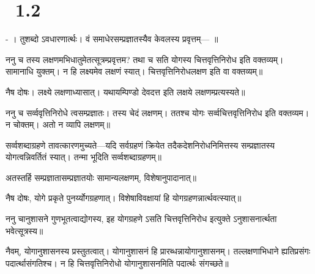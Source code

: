 \section{\pysv\ 1.2}
\setlength{\footmarkwidth}{1.8em}
\pagewiselinenumbers
\newlength{\dawidth}
\settowidth{\dawidth}{ड}
\addtolength{\dawidth}{0.08em}
 \kern -\dawidth {} । तुशब्दो ऽवधारणार्त्थः। वं समाधेरसम्प्रज्ञातस्यैव केवलस्य  प्रवृत्तम्---
\newfontfamily
{} \mds {}॥

ननु च त\mte स्य लक्षणमभिधातुमेतत्सूत्रम्प्रवृत्तम? तथा च सति योगस्य चित्तवृत्तिनिरोध इति वक्तव्यम्। 
सामानाधि युक्तम्। न हि लक्ष्यमेव लक्षणं स्यात्। चित्तवृत्तिनिरोधलक्षण इति वा वक्तव्यम्॥

नैष दोषः। लक्ष्ये ल\mms क्षण\mds ाध्यासात्। यथा\mte यम्पिण्डो देवदत्त इति लक्षये लक्षणम्प्रत्यस्यते॥

ननु \mms च स\mme र्व्ववृत्तिनिरोधे त्वसम्प्रज्ञातः। तस्य चे\mms दं लक्षणम्। ततश्च योगः सर्व्वचि\mme त्तवृत्तिनिरोध इति वक्तव्यम। न चोक्तम्। अतो न व्या\mds पि \mms लक्षणम्॥

सर्व्वशब्दाग्रहणे तावत्कारणमुच्यते---यदि सर्व\mte ग्रहणं क्रियेत तदैकदेशनिरोधनिमित्तस्य सम्प्रज्ञातस्य योगत्वन्निवर्तितं स्यात्। तन्मा भूदिति सर्व्वशब्दाग्रहणम्॥

अतस्तर्हि सम्प्रज्ञातासम्प्रज्ञातयोः सामान्यलक्षणम्, विशेषानुपादानात्॥

नैष दोषः, योगे प्रकृते पुनर्य्योगग्रहणात्। वि\mts शेषाविवक्षायां हि यो\mde ग\mme ग्रहणन्नार्त्थवत्स्यात्॥

ननु चानुशासने गुणभूतत्वाद्योगस्य, इह योगग्रहणे ऽसति चित्तवृत्तिनिरोध इत्युक्ते ऽनुशासनार्त्थता भवेत्सूत्रस्य॥

नैवम्, योगानुशासनस्य प्रस्तुतत्वात्। योगानुशासनं हि प्रारब्धन्नायो\mts गानुशासनम्। त\mde ल्ल\mme क्ष\-णाभिधाने 
ह्यतिप्रसंगः पदार्त्थासंगतिश्च। न हि चित्तवृत्तिनिरोधो योगानुशासनमिति पदार्त्थः संगच्छते॥

